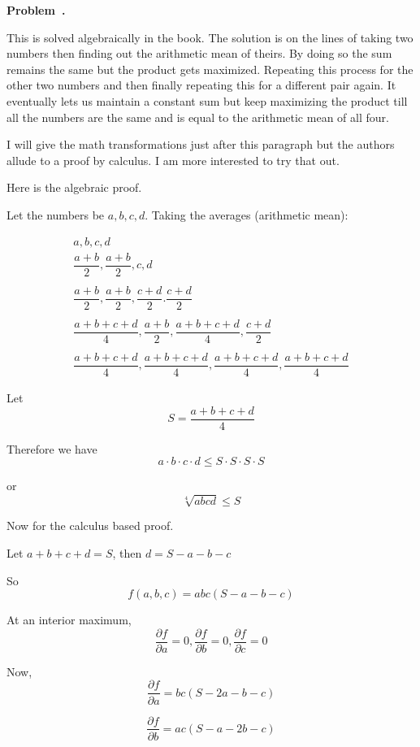 \documentclass[10pt]{article}
\newcounter{problem}
\newenvironment{problem}[1][]{
  \refstepcounter{problem}
  \par\noindent\textbf{Problem~\theproblem. #1}\par
  \vspace{0.5em}
}{\vspace{1em}}
\begin{document}
\begin{problem} %
  This is solved algebraically in the book. The solution is on the lines of taking two numbers then finding out 
  the arithmetic mean of theirs. By doing so the sum remains the same but the product gets maximized. Repeating this process 
  for the other two numbers and then finally repeating this for a different pair again. It eventually lets us 
  maintain a constant sum but keep maximizing the product till all the numbers are the same and is equal to the arithmetic mean of all four.

  I will give the math transformations just after this paragraph but the authors allude to a proof by calculus. I am more interested to try that out.

  Here is the algebraic proof. 

  Let the numbers be $a, b, c, d$. Taking the averages (arithmetic mean):

  \begin{gather*}
    a , b , c, d\\
    \dfrac{a + b}{2}, \dfrac{a + b}{2}, c, d\\\\
    \dfrac{a + b}{2}, \dfrac{a + b}{2}, \dfrac{c + d}{2}. \dfrac{c + d}{2}\\\\
    \dfrac{a + b + c + d}{4}, \dfrac{a + b}{2}, \dfrac{a + b + c + d}{4}, \dfrac{c + d}{2}\\\\
    \dfrac{a + b + c + d}{4}, \dfrac{a + b + c + d}{4}, \dfrac{a + b + c + d}{4}, \dfrac{a + b + c + d}{4}
  \end{gather*}

  Let
  \[
  S = \dfrac{a + b + c + d}{4}
  \]

  Therefore we have
  \[
  a \cdot b \cdot c \cdot d \le S \cdot S \cdot S \cdot S 
  \]

  or
  \[
  \sqrt[4]{abcd} \le S
  \]

  Now for the calculus based proof.

Let $a + b + c + d = S$, then $d = S - a - b - c$

So
\[
f(a,b,c) = abc(S - a - b - c)
\]

At an interior maximum,
\[
\dfrac{\partial f}{\partial a} = 0, \dfrac{\partial f}{\partial b} = 0, \dfrac{\partial f}{\partial c} = 0
\]

Now,
\[
\dfrac{\partial f}{\partial a} = bc(S - 2a - b - c)
\]

\[
\dfrac{\partial f}{\partial b} = ac(S - a - 2b - c)
\]


\end{problem}
\end{document}

